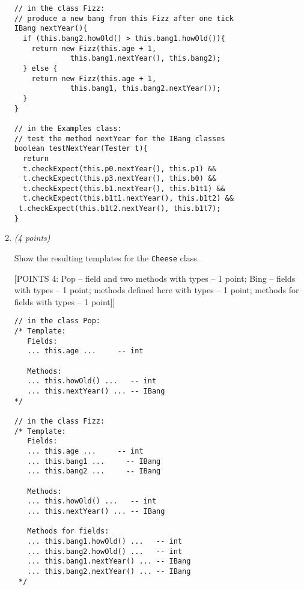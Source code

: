 \documentclass[11pt]{article}
\newcommand\code[1]{\texttt{#1}}
\newcounter{Pctr}
\newenvironment{problem}{\stepcounter{Pctr}%
\begin{description}
\item[\noindent{\bf Problem} \arabic{Pctr}] 
\end{description}}{\relax}
\begin{document}
\begin{problem}
\begin{enumerate}
\begin{verbatim}
// in the class Fizz:
// produce a new bang from this Fizz after one tick
IBang nextYear(){
  if (this.bang2.howOld() > this.bang1.howOld()){
    return new Fizz(this.age + 1, 
             this.bang1.nextYear(), this.bang2);
  } else {
    return new Fizz(this.age + 1, 
             this.bang1, this.bang2.nextYear());
  }
}

// in the Examples class:
// test the method nextYear for the IBang classes
boolean testNextYear(Tester t){
  return
  t.checkExpect(this.p0.nextYear(), this.p1) &&
  t.checkExpect(this.p3.nextYear(), this.b0) &&
  t.checkExpect(this.b1.nextYear(), this.b1t1) &&
  t.checkExpect(this.b1t1.nextYear(), this.b1t2) &&
 t.checkExpect(this.b1t2.nextYear(), this.b1t7);
}
\end{verbatim}
\endsol

\newpage
{}


\newpage
\item {\em{(4 points)}}

Show the resulting templates for the \code{Cheese} class.

\begsol{\vspace{0.5in}}
[POINTS 4:
  Pop -- field and two methods with types  -- 1 point;
  Bing -- fields with types                -- 1 point;
          methods defined here with types  -- 1 point;
          methods for fields with types    -- 1 point]]

\begin{verbatim}
// in the class Pop:
/* Template:
   Fields:
   ... this.age ...     -- int
   
   Methods:
   ... this.howOld() ...   -- int
   ... this.nextYear() ... -- IBang
*/

// in the class Fizz:
/* Template:
   Fields:
   ... this.age ...     -- int
   ... this.bang1 ...     -- IBang
   ... this.bang2 ...     -- IBang
   
   Methods:
   ... this.howOld() ...   -- int
   ... this.nextYear() ... -- IBang
   
   Methods for fields:
   ... this.bang1.howOld() ...   -- int
   ... this.bang2.howOld() ...   -- int
   ... this.bang1.nextYear() ... -- IBang
   ... this.bang2.nextYear() ... -- IBang   
 */	
\end{verbatim}
\endsol


\end{enumerate}
\end{problem}
\end{document}
